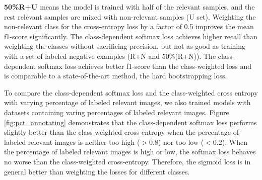 \begin{table}[t]
{\textbf{50\%R+U} means the model is trained with half of the relevant samples, and the rest relevant samples are mixed with non-relevant samples (U set).
Weighting the non-relevant class for the cross-entropy loss by a factor of 0.5 improves the mean f1-score significantly.
The class-dependent softmax loss achieves higher recall than weighting the classes without sacrificing precision, but not as good as training with a set of labeled negative examples (R+N and 50\%(R+N)).
The class-dependent softmax loss achieves better f1-score than the class-weighted loss and is comparable to a state-of-the-art method, the hard bootstrapping loss.
}
\label{tab:cifar}
\end{table}


To compare the class-dependent softmax loss and the class-weighted cross entropy with varying percentage of labeled relevant images, we also trained models with datasets containing varing percentages of labeled relevant images.
Figure \ref{fig:pct_annotating} demonstrates that the class-dependent softmax loss performs slightly better than the class-weighted cross-entropy when the percentage of labeled relevant images is neither too high ($>0.8$) nor too low ($<0.2$).
When the percentage of labeled relevant images is high or low, the softmax loss behaves no worse than the class-weighted cross-entropy.
Therefore, the sigmoid loss is in general better than weighting the losses for different classes.


